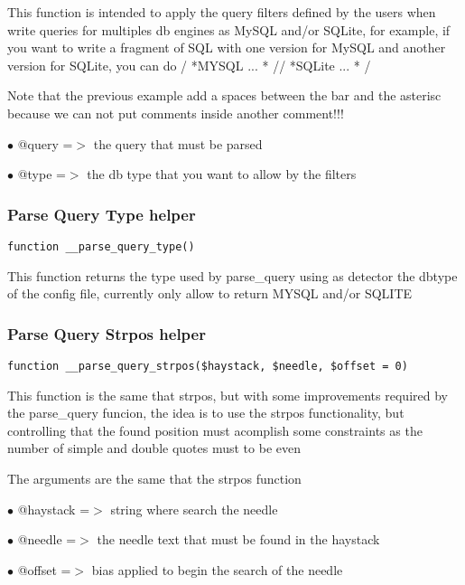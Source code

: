 \documentclass[a4paper]{article}
\begin{document}
This function is intended to apply the query filters defined by the users
when write queries for multiples db engines as MySQL and/or SQLite, for
example, if you want to write a fragment of SQL with one version for MySQL
and another version for SQLite, you can do / *MYSQL ... * // *SQLite ... * /

Note that the previous example add a spaces between the bar and the asterisc
because we can not put comments inside another comment!!!

\begin{compactitem}
\item[\color{myblue}$\bullet$] @query =$>$ the query that must be parsed
\item[\color{myblue}$\bullet$] @type  =$>$ the db type that you want to allow by the filters
\end{compactitem}

\hypertarget{toc216}{}
\subsubsection{Parse Query Type helper}

\begin{lstlisting}
function __parse_query_type()
\end{lstlisting}

This function returns the type used by parse\_query using as detector the
dbtype of the config file, currently only allow to return MYSQL and/or SQLITE

\hypertarget{toc217}{}
\subsubsection{Parse Query Strpos helper}

\begin{lstlisting}
function __parse_query_strpos($haystack, $needle, $offset = 0)
\end{lstlisting}

This function is the same that strpos, but with some improvements required
by the parse\_query funcion, the idea is to use the strpos functionality, but
controlling that the found position must acomplish some constraints as the
number of simple and double quotes must to be even

The arguments are the same that the strpos function

\begin{compactitem}
\item[\color{myblue}$\bullet$] @haystack =$>$ string where search the needle
\item[\color{myblue}$\bullet$] @needle   =$>$ the needle text that must be found in the haystack
\item[\color{myblue}$\bullet$] @offset   =$>$ bias applied to begin the search of the needle
\end{compactitem}
\end{document}
